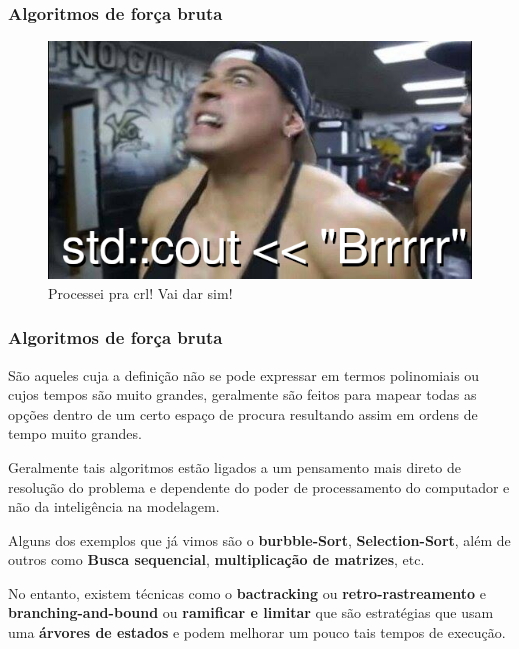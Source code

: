 \begin{frame}
	\frametitle{Algoritmos de força bruta}
	\begin{figure}
		\centering
		\includegraphics[width=.9\linewidth]{images/bodyBuildPorra}
		\caption{Processei pra crl! Vai dar sim!}
		\label{fig:bodybuildporra}
	\end{figure}
	
\end{frame}

\begin{frame}
	\frametitle{Algoritmos de força bruta}
	\par São aqueles cuja a definição não se pode expressar em termos polinomiais ou cujos tempos são muito grandes, geralmente são feitos para mapear todas as opções dentro de um certo espaço de procura resultando assim em ordens de tempo muito grandes.
	
	\par Geralmente tais algoritmos estão ligados a um pensamento mais direto de resolução do problema e dependente do poder de processamento do computador e não da inteligência na modelagem.\newline
	
	\par Alguns dos exemplos que já vimos são o \textbf{burbble-Sort}, \textbf{Selection-Sort}, além de outros como \textbf{Busca sequencial}, \textbf{multiplicação de matrizes}, etc.\newline
	
	\par No entanto, existem técnicas como o \textbf{bactracking} ou \textbf{retro-rastreamento} e \textbf{branching-and-bound} ou \textbf{ramificar e limitar} que são estratégias que usam uma \textbf{árvores de estados} e podem melhorar um pouco tais tempos de execução.	
\end{frame}

